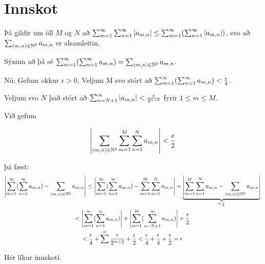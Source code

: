 \documentclass[12pt]{book}
\begin{document}
\section*{Innskot}

{

\def\mn{(m,n)}
\def\amn{a_{m,n}}
\def\summn{\sum_{\mn \in \N^2}}

Þá gildir um öll $M$ og $N$ að $\sum_{m=1}^{\infty} \sum_{n=1}^{\infty} \abs{\amn} \leq \summinfty (\sumoinfty \abs{\amn})$, svo að $\sum_{\mn \in \N^2} \amn$ er alsamleitin.

Sýnum að þá sé $\summinfty ( \sumoinfty \amn ) = \summn \amn$.

Nú: Gefum okkur $\epsilon > 0$. Veljum M svo stórt að $\summinfty ( \sumoinfty \amn ) < \eps{4}$.

Veljum svo $N$ það stórt að $\sum_{n = N+1}^{\infty} \abs{\amn} < \eps{2^{n+2}}$ fyrir $1 \leq m \leq M$.


Við gefum 

\[\abs{\sum_{(m,n) \in \N^2} \sum_{m=1}^M \sum_{n=1}^N \amn } < \eps{2} \]

þá fæst: 
\begin{gather*}
\abs{\summinfty ( \sumoinfty \amn) - \sum_{(m,n) \in \N^2} \amn}  \leq \abs{\summinfty ( \sumoinfty \amn) - \sum_{m=1}^{M} \sum_{n=1}^N \amn} + \underbrace{\abs{\sum_{m=1}^M \sum_{n=1}^N \amn - \sum_{(m,n) \in \N^2} \amn}}_{< \eps{2}}\\
< \abs{\summinfty ( \sumoinfty \amn)} + \abs{\sum_{m=1}^M ( \sum_{n = N+1}^{\infty} \amn)} + \eps{2}\\
< \eps{4} + \sum^n \eps{2^{m+2}} + \eps{2} < \eps{4} + \eps{4} + \eps{2} = \epsilon
\end{gather*}

Hér líkur innskoti.

}

\section{}
\end{document}

